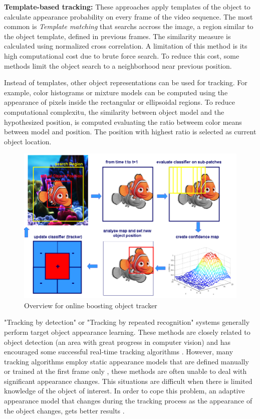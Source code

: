 \textbf{Template-based tracking:}  These approaches apply templates of the object to calculate appearance probability on every frame of the video sequence. The most common is \textit{Template matching} \cite{Korman2013} that searchs accross the image, a region similar to the object template, defined in previous frames. The similarity measure is calculated using normalized cross correlation. A limitation of this method is its high computational cost due to brute force search. To reduce this cost, some methods limit the object search to a neighborhood near previous position.

Instead of templates, other object representations can be used for tracking. For example, color histograms or mixture models can be computed using the appearance of pixels inside the rectangular or ellipsoidal regions. To reduce computational complexitu, the similarity between object model and the hypothesized position, is computed evaluating the ratio betweem color means between model and position. The position with highest ratio is selected as current object location.

\begin{figure}[t]
	\centering
		\includegraphics[width=0.7\linewidth]{Figures/overview_boost.png}
	\caption{Overview for online boosting object tracker}
	\label{fig::overview_boost}
\end{figure}	

"Tracking by detection" or "Tracking by repeated recognition" \cite{Mori2006} systems generally perform target object appearance learning. These methods are closely related to object detection (an area with great progress in computer vision) and has encouraged some successful real-time tracking algorithms \cite{Liu2007,Grabner2006}. However, many tracking algorithms employ static appearance models that are defined manually or trained at the first frame only \cite{Isard2001, Lepetit2006, Black1996, Comaniciu2000, Adam2006}, these methods are often unable to deal with significant appearance changes. This situations are difficult when there is limited knowledge of the object of interest. In order to cope this problem, an adaptive appearance model that changes during the tracking process as the appearance of the object changes, gets better results \cite{Ross2007,Matthews2004,Jepson2003}.

